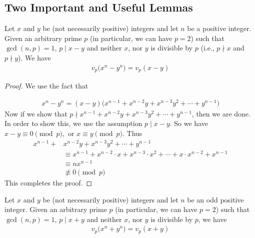 \documentclass[main.tex]{subfile}
\begin{document}
\subsection{Two Important and Useful Lemmas}

    \begin{lemma}\label{lem:lte-firstlemma}
         Let $x$ and $y$ be (not necessarily positive) integers and let $n$ be a positive integer. Given an arbitrary prime $p$ (in particular, we can have $p=2$) such that $ \gcd(n,p) = 1$, $p \mid  x - y$ and neither $x$, nor $y$ is divisible by $p$ (i.e., $p \nmid x$ and $p \nmid y$).  We have
           \begin{align*}
	            v_p\big(  x^n - y^n \big) = v_p(  x - y )
           \end{align*}
    \end{lemma}

    \begin{proof}
        We use the fact that

        \begin{align*}
        x^n - y^n = (x - y)\big(x^{n - 1} + x^{n - 2}y + x^{n - 3}y^2 + \cdots + y^{n - 1}\big)
        \end{align*}
        Now if we show that $p \nmid x^{n - 1} + x^{n - 2}y + x^{n - 3}y^2 + \cdots + y^{n - 1}$, then we are done.
        In order to show this, we use the assumption $p \mid x-y.$  So we have $x-y \equiv 0 \pmod p,$
        or $x \equiv y \pmod p.$  Thus
        \begin{align*}
        x^{n - 1} + & x^{n - 2}y + x^{n - 3}y^2 + \cdots + y^{n - 1} \\
        & \equiv x^{n-1} +x^{n-2}  \cdot x +x^{n - 3} \cdot x^2 +\cdots +x \cdot x^{n-2} + x^{n-1} \\
        & \equiv n x^{n-1} \\
        & \not\equiv 0 \pmod p
        \end{align*}
        This completes the proof.
       \end{proof}


    \begin{lemma}\label{secondlemma}
        Let $ x$ and $y$ be (not necessarily positive) integers and let $n$ be an odd positive integer. Given an arbitrary prime $p$ (in particular, we can have $p=2$) such that $ \gcd(n,p) = 1$, $p\mid x + y$ and neither $x$, nor $y$ is divisible by $p$, we have
        \begin{align*}
	        v_p\big(  x^n + y^n \big) = v_p ( x + y )
        \end{align*}
    \end{lemma}
\end{document}
